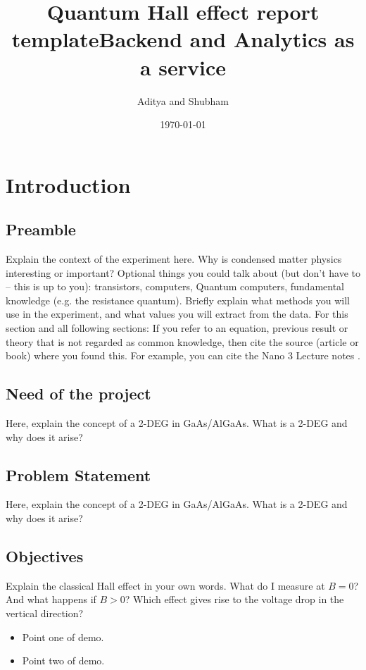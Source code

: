 \documentclass[a4paper]{report}
\title{Quantum Hall effect report template}
\title{Backend and Analytics as a service}
\author{Aditya and Shubham}
\date{\today}
\begin{document}
    
    \begin{titlepage}
      \maketitle 
    \end{titlepage}    
    
    \newpage
    \tableofcontents{}    

    \chapter {Introduction}
    
    \section{Preamble}
    \label{sec:introduction}    
    Explain the context of the experiment here. Why is condensed matter physics interesting or important?
    Optional things you could talk about (but don't have to -- this is up to you): transistors, computers, Quantum computers, fundamental knowledge (e.g. the resistance quantum).    
    Briefly explain what methods you will use in the experiment, and what values you will extract from the data.    
    For this section and all following sections: If you refer to an equation, previous result or theory that is not regarded as common knowledge, then cite the source (article or book) where you found this. For example, you can cite the Nano 3 Lecture notes \cite{nano3}.
    
    \section{Need of the project}
    \label{sec:theory}
    Here, explain the concept of a 2-DEG in GaAs/AlGaAs. What is a 2-DEG and why does it arise?
    \section{Problem Statement}
    Here, explain the concept of a 2-DEG in GaAs/AlGaAs. What is a 2-DEG and why does it arise?
    \section{Objectives}
    Explain the classical Hall effect in your own words. What do I measure at $B=0$? And what happens if $B>0$? Which effect gives rise to the voltage drop in the vertical direction?
    \begin{itemize}
      \item Point one of demo.
      \item Point two of demo.
      \end{itemize}
\end{document}
